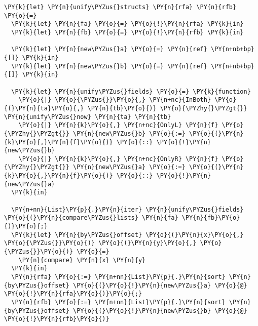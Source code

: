 \begin{Verbatim}[commandchars=\\\{\}]
\PY{k}{let} \PY{n}{unify\PYZus{}structs} \PY{n}{rfa} \PY{n}{rfb} \PY{o}{=}
  \PY{k}{let} \PY{n}{fa} \PY{o}{=} \PY{o}{!}\PY{n}{rfa} \PY{k}{in}
  \PY{k}{let} \PY{n}{fb} \PY{o}{=} \PY{o}{!}\PY{n}{rfb} \PY{k}{in}

  \PY{k}{let} \PY{n}{new\PYZus{}a} \PY{o}{=} \PY{n}{ref} \PY{n+nb+bp}{[]} \PY{k}{in}
  \PY{k}{let} \PY{n}{new\PYZus{}b} \PY{o}{=} \PY{n}{ref} \PY{n+nb+bp}{[]} \PY{k}{in}

  \PY{k}{let} \PY{n}{unify\PYZus{}fields} \PY{o}{=} \PY{k}{function}
    \PY{o}{|} \PY{o}{\PYZus{}}\PY{o}{,} \PY{n+nc}{InBoth} \PY{o}{(}\PY{n}{ta}\PY{o}{,} \PY{n}{tb}\PY{o}{)} \PY{o}{\PYZhy{}\PYZgt{}} \PY{n}{unify\PYZus{}now} \PY{n}{ta} \PY{n}{tb}
    \PY{o}{|} \PY{n}{k}\PY{o}{,} \PY{n+nc}{OnlyL} \PY{n}{f} \PY{o}{\PYZhy{}\PYZgt{}} \PY{n}{new\PYZus{}b} \PY{o}{:=} \PY{o}{(}\PY{n}{k}\PY{o}{,}\PY{n}{f}\PY{o}{)} \PY{o}{::} \PY{o}{!}\PY{n}{new\PYZus{}b}
    \PY{o}{|} \PY{n}{k}\PY{o}{,} \PY{n+nc}{OnlyR} \PY{n}{f} \PY{o}{\PYZhy{}\PYZgt{}} \PY{n}{new\PYZus{}a} \PY{o}{:=} \PY{o}{(}\PY{n}{k}\PY{o}{,}\PY{n}{f}\PY{o}{)} \PY{o}{::} \PY{o}{!}\PY{n}{new\PYZus{}a}
  \PY{k}{in}

  \PY{n+nn}{List}\PY{p}{.}\PY{n}{iter} \PY{n}{unify\PYZus{}fields} \PY{o}{(}\PY{n}{compare\PYZus{}lists} \PY{n}{fa} \PY{n}{fb}\PY{o}{)}\PY{o}{;}
  \PY{k}{let} \PY{n}{by\PYZus{}offset} \PY{o}{(}\PY{n}{x}\PY{o}{,} \PY{o}{\PYZus{}}\PY{o}{)} \PY{o}{(}\PY{n}{y}\PY{o}{,} \PY{o}{\PYZus{}}\PY{o}{)} \PY{o}{=}
    \PY{n}{compare} \PY{n}{x} \PY{n}{y}
  \PY{k}{in}
  \PY{n}{rfa} \PY{o}{:=} \PY{n+nn}{List}\PY{p}{.}\PY{n}{sort} \PY{n}{by\PYZus{}offset} \PY{o}{(}\PY{o}{!}\PY{n}{new\PYZus{}a} \PY{o}{@} \PY{o}{!}\PY{n}{rfa}\PY{o}{)}\PY{o}{;}
  \PY{n}{rfb} \PY{o}{:=} \PY{n+nn}{List}\PY{p}{.}\PY{n}{sort} \PY{n}{by\PYZus{}offset} \PY{o}{(}\PY{o}{!}\PY{n}{new\PYZus{}b} \PY{o}{@} \PY{o}{!}\PY{n}{rfb}\PY{o}{)}
\end{Verbatim}
